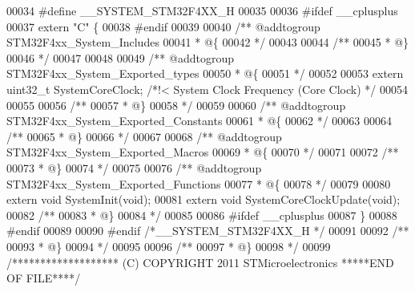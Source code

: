 \begin{DoxyCode}
00034 \textcolor{preprocessor}{#}\textcolor{preprocessor}{define} \textcolor{preprocessor}{\_\_SYSTEM\_STM32F4XX\_H}
00035 
00036 \textcolor{preprocessor}{#}\textcolor{preprocessor}{ifdef} \_\_cplusplus
00037  \textcolor{keyword}{extern} \textcolor{stringliteral}{"C"} \{
00038 \textcolor{preprocessor}{#}\textcolor{preprocessor}{endif}
00039 
00040 \textcolor{comment}{/** @addtogroup STM32F4xx\_System\_Includes}
00041 \textcolor{comment}{  * @\{}
00042 \textcolor{comment}{  */}
00043 
00044 \textcolor{comment}{/**}
00045 \textcolor{comment}{  * @\}}
00046 \textcolor{comment}{  */}
00047 
00048 
00049 \textcolor{comment}{/** @addtogroup STM32F4xx\_System\_Exported\_types}
00050 \textcolor{comment}{  * @\{}
00051 \textcolor{comment}{  */}
00052 
00053 \textcolor{keyword}{extern} uint32_t SystemCoreClock;          \textcolor{comment}{/*!< System Clock Frequency (Core Clock) */}
00054 
00055 
00056 \textcolor{comment}{/**}
00057 \textcolor{comment}{  * @\}}
00058 \textcolor{comment}{  */}
00059 
00060 \textcolor{comment}{/** @addtogroup STM32F4xx\_System\_Exported\_Constants}
00061 \textcolor{comment}{  * @\{}
00062 \textcolor{comment}{  */}
00063 
00064 \textcolor{comment}{/**}
00065 \textcolor{comment}{  * @\}}
00066 \textcolor{comment}{  */}
00067 
00068 \textcolor{comment}{/** @addtogroup STM32F4xx\_System\_Exported\_Macros}
00069 \textcolor{comment}{  * @\{}
00070 \textcolor{comment}{  */}
00071 
00072 \textcolor{comment}{/**}
00073 \textcolor{comment}{  * @\}}
00074 \textcolor{comment}{  */}
00075 
00076 \textcolor{comment}{/** @addtogroup STM32F4xx\_System\_Exported\_Functions}
00077 \textcolor{comment}{  * @\{}
00078 \textcolor{comment}{  */}
00079 
00080 \textcolor{keyword}{extern} \textcolor{keywordtype}{void} SystemInit(\textcolor{keywordtype}{void});
00081 \textcolor{keyword}{extern} \textcolor{keywordtype}{void} SystemCoreClockUpdate(\textcolor{keywordtype}{void});
00082 \textcolor{comment}{/**}
00083 \textcolor{comment}{  * @\}}
00084 \textcolor{comment}{  */}
00085 
00086 \textcolor{preprocessor}{#}\textcolor{preprocessor}{ifdef} \_\_cplusplus
00087 \}
00088 \textcolor{preprocessor}{#}\textcolor{preprocessor}{endif}
00089 
00090 \textcolor{preprocessor}{#}\textcolor{preprocessor}{endif} \textcolor{comment}{/*\_\_SYSTEM\_STM32F4XX\_H */}
00091 
00092 \textcolor{comment}{/**}
00093 \textcolor{comment}{  * @\}}
00094 \textcolor{comment}{  */}
00095 
00096 \textcolor{comment}{/**}
00097 \textcolor{comment}{  * @\}}
00098 \textcolor{comment}{  */}
00099 \textcolor{comment}{/******************* (C) COPYRIGHT 2011 STMicroelectronics *****END OF FILE****/}
\end{DoxyCode}
